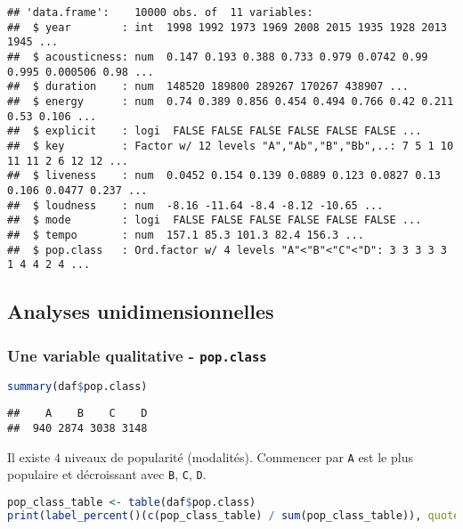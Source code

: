\documentclass[
  11pt,
  xcolor = usenames,dvipsnames]{article}
\newcommand{\passthrough}[1]{#1}
\begin{document}
\begin{lstlisting}
## 'data.frame':    10000 obs. of  11 variables:
##  $ year        : int  1998 1992 1973 1969 2008 2015 1935 1928 2013 1945 ...
##  $ acousticness: num  0.147 0.193 0.388 0.733 0.979 0.0742 0.99 0.995 0.000506 0.98 ...
##  $ duration    : num  148520 189800 289267 170267 438907 ...
##  $ energy      : num  0.74 0.389 0.856 0.454 0.494 0.766 0.42 0.211 0.53 0.106 ...
##  $ explicit    : logi  FALSE FALSE FALSE FALSE FALSE FALSE ...
##  $ key         : Factor w/ 12 levels "A","Ab","B","Bb",..: 7 5 1 10 11 11 2 6 12 12 ...
##  $ liveness    : num  0.0452 0.154 0.139 0.0889 0.123 0.0827 0.13 0.106 0.0477 0.237 ...
##  $ loudness    : num  -8.16 -11.64 -8.4 -8.12 -10.65 ...
##  $ mode        : logi  FALSE FALSE FALSE FALSE FALSE FALSE ...
##  $ tempo       : num  157.1 85.3 101.3 82.4 156.3 ...
##  $ pop.class   : Ord.factor w/ 4 levels "A"<"B"<"C"<"D": 3 3 3 3 3 1 4 4 2 4 ...
\end{lstlisting}

\hypertarget{analyses-unidimensionnelles}{%
\subsection{Analyses unidimensionnelles}\label{analyses-unidimensionnelles}}

\hypertarget{une-variable-qualitative---pop.class}{%
\subsubsection{\texorpdfstring{Une variable qualitative - \texttt{pop.class}}{Une variable qualitative - pop.class}}\label{une-variable-qualitative---pop.class}}

\begin{lstlisting}[language=R]
summary(daf$pop.class)
\end{lstlisting}

\begin{lstlisting}
##    A    B    C    D 
##  940 2874 3038 3148
\end{lstlisting}

Il existe 4 niveaux de popularité (modalités). Commencer par \passthrough{\lstinline!A!} est le plus populaire et décroissant avec \passthrough{\lstinline!B!}, \passthrough{\lstinline!C!}, \passthrough{\lstinline!D!}.

\begin{lstlisting}[language=R]
pop_class_table <- table(daf$pop.class)
print(label_percent()(c(pop_class_table) / sum(pop_class_table)), quote = F)
\end{lstlisting}
\end{document}
